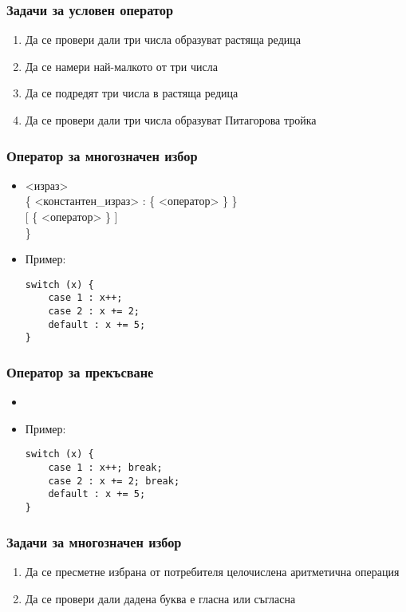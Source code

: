 \documentclass{beamer}
\begin{document}
\begin{frame}
  \frametitle{Задачи за условен оператор}
  
  \begin{enumerate}[<+->]
  \item Да се провери дали три числа образуват растяща редица
  \item Да се намери най-малкото от три числа
  \item Да се подредят три числа в растяща редица
  \item Да се провери дали три числа образуват Питагорова тройка
  \end{enumerate}
\end{frame}

\begin{frame}[fragile]
  \frametitle{Оператор за многозначен избор}
  
  \begin{itemize}
  \item
    <израз>\tta{) \{}\\
    \hspace{3ex}\{ <константен\_израз> \tta: \{ <оператор> \} \}\\
    \hspace{3ex}[  \{ <оператор> \} ]\\
    \tta\}
  \item Пример:
\begin{lstlisting}
switch (x) {
	case 1 : x++;
	case 2 : x += 2;
	default : x += 5;
}
\end{lstlisting}
  \end{itemize}
\end{frame}

\begin{frame}[fragile]
  \frametitle{Оператор за прекъсване}
  
  \begin{itemize}
  \item {}
  \item Пример:
\begin{lstlisting}
switch (x) {
	case 1 : x++; break;
	case 2 : x += 2; break;
	default : x += 5;
}
\end{lstlisting}
  \end{itemize}
\end{frame}

\begin{frame}
  \frametitle{Задачи за многозначен избор}
  
  \begin{enumerate}[<+->]
  \item Да се пресметне избрана от потребителя целочислена аритметична операция
  \item Да се провери дали дадена буква е гласна или съгласна
  \end{enumerate}
\end{frame}
\end{document}
